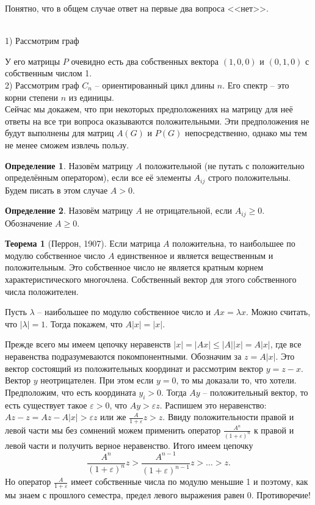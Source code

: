 \documentclass[10pt,a4paper,oneside]{book}
\theoremstyle{definition}
\newtheorem*{defn}{\color{yellow!30!red} Определение}
\newtheorem{thm}{\color{red!40!black}Теорема}
\renewcommand{\leq}{\leqslant}
\renewcommand{\geq}{\geqslant}
\def\exm{\noindent {\bf Примеры:}}
\def\eps{\varepsilon}
\def\thrm{\begin{thm}}
\def\ethrm{\end{thm}}
\def\dfn{\begin{defn}}
\def\edfn{\end{defn}}
\begin{document}
Понятно, что в общем случае ответ на первые два вопроса <<нет>>.

\exm \\
1) Рассмотрим граф 
\begin{center}
\end{center}
У его матрицы $P$ очевидно есть два собственных вектора $(1,0,0)$ и $(0,1,0)$ с собственным числом 1.\\
2) Рассмотрим граф $C_n$ -- ориентированный цикл длины $n$. Его спектр -- это корни степени $n$ из единицы.\\

Сейчас мы докажем, что при некоторых предположениях на матрицу для неё ответы на все три вопроса оказываются положительными. Эти предположения не будут выполнены для матриц $A(G)$ и  $P(G)$ непосредственно, однако мы тем не менее сможем извлечь пользу.

\dfn Назовём матрицу $A$ положительной (не путать с положительно определённым оператором), если все её элементы $A_{ij}$ строго положительны. Будем писать в этом случае $A>0$.
\edfn

\dfn Назовём матрицу  $A$ не отрицательной, если $A_{ij}\geq 0$. Обозначение $A \geq 0$.
\edfn

\thrm[Перрон, 1907] Если матрица $A$ положительна, то наибольшее по модулю собственное число $A$ единственное и является вещественным и положительным. Это собственное число не является кратным корнем характеристического многочлена. Собственный вектор для этого собственного числа положителен.
\ethrm
\proof Пусть $\lambda$ -- наибольшее по модулю собственное число и $Ax=\lambda x$. Можно считать, что $|\lambda|=1$. Тогда покажем, что $A|x|=|x|$.

Прежде всего мы имеем цепочку неравенств $|x|=|Ax|\leq |A||x|=A|x|$, где все неравенства подразумеваются покомпонентными. Обозначим за $z=A|x|$. Это вектор состоящий из положительных координат и рассмотрим вектор $y=z-x$. Вектор $y$ неотрицателен. При этом если $y=0$, то мы доказали то, что хотели. Предположим, что есть координата $y_i>0$. Тогда $Ay$ -- положительный вектор, то есть существует такое $\eps>0$, что $Ay>\eps z$. Распишем это неравенство: $Az - z= Az-A|x|> \eps z$ или же $\frac{A}{1+\eps}z>z$. Ввиду положительности правой и левой части мы без сомнений можем применить оператор $\frac{A^n}{(1+\eps)^n}$ к правой и левой части и получить верное неравенство. Итого имеем цепочку 
$$\frac{A^n}{(1+\eps)^n}z>\frac{A^{n-1}}{(1+\eps)^{n-1}}z> \dots > z.$$
Но оператор $\frac{A}{1+\eps}$ имеет собственные числа по модулю меньшие 1 и поэтому, как мы знаем с прошлого семестра, предел левого выражения равен 0. Противоречие!
\end{document}
